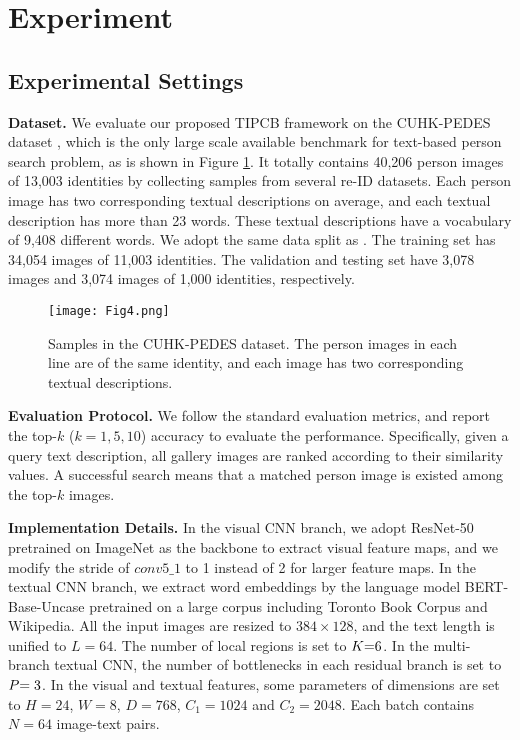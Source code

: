 \documentclass[review]{elsarticle}
\begin{document}
\section{Experiment}
\subsection{Experimental Settings}
\textbf{Dataset.} We evaluate our proposed TIPCB framework on the CUHK-PEDES dataset \cite{7}, which is the only large scale available benchmark for text-based person search problem, as is shown in Figure \ref{fig4}. It totally contains 40,206 person images of 13,003 identities by collecting samples from several re-ID datasets. Each person image has two corresponding textual descriptions on average, and each textual description has more than 23 words. These textual descriptions have a vocabulary of 9,408 different words. We adopt the same data split as \cite{7}. The training set has 34,054 images of 11,003 identities. The validation and testing set have 3,078 images and 3,074 images of 1,000 identities, respectively.

\begin{figure}[!t]
\centering
\texttt{[image: Fig4.png]}\\
\caption{Samples in the CUHK-PEDES dataset. The person images in each line are of the same identity, and each image has two corresponding textual descriptions.}
\label{fig4}
\end{figure}

\textbf{Evaluation Protocol.} We follow the standard evaluation metrics, and report the top-$k$ ($k = 1,5,10$) accuracy to evaluate the performance. Specifically, given a query text description, all gallery images are ranked according to their similarity values. A successful search means that a matched person image is existed among the top-$k$ images.

\textbf{Implementation Details.} In the visual CNN branch, we adopt ResNet-50 pretrained on ImageNet \cite{51} as the backbone to extract visual feature maps, and we modify the stride of $conv5\_1$ to 1 instead of 2 for larger feature maps. In the textual CNN branch, we extract word embeddings by the language model BERT-Base-Uncase pretrained on a large corpus including Toronto Book Corpus and Wikipedia. All the input images are resized to $384 \times 128$, and the text length is unified to $L = 64$. The number of local regions is set to $K{\rm{ = }}6$. In the multi-branch textual CNN, the number of bottlenecks in each residual branch is set to $P{\rm{ = 3}}$. In the visual and textual features, some parameters of dimensions are set to $H = 24$, $W = 8$, $D = 768$, ${C_1} = 1024$ and ${C_2} = 2048$. Each batch contains $N = 64$ image-text pairs. 
\end{document}
